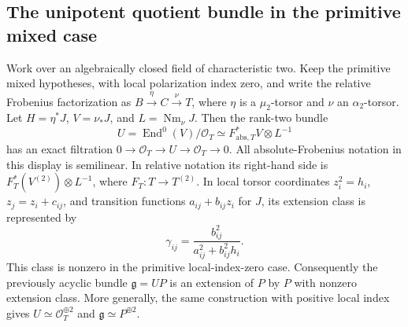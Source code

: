 \subsection{The unipotent quotient bundle in the primitive mixed case}

\begin{lemma}
\label{lem:DE-A3-primitive-unipotent}
Work over an algebraically closed field of characteristic two. Keep the
primitive mixed hypotheses, with local polarization index zero,
and write the relative Frobenius factorization as
\(B\xrightarrow{\eta}C\xrightarrow{\nu}T\), where \(\eta\) is a
\(\mu _2\)-torsor and \(\nu\) an \(\alpha _2\)-torsor. Let
\(H=\eta^*J\), \(V=\nu_*J\), and \(L=\operatorname{Nm}_\nu J\).
Then the rank-two bundle
\[
 U=\operatorname{End}^0(V)/\mathcal O_T
   \simeq F_{\mathrm{abs},T}^*V\otimes L^{-1}
\]
has an exact filtration \(0\to\mathcal O_T\to U\to\mathcal O_T\to0\).
All absolute-Frobenius notation in this display is semilinear. In relative
notation its right-hand side is \(F_T^*(V^{(2)})\otimes L^{-1}\), where
\(F_T:T\to T^{(2)}\).
In local torsor coordinates \(z_i^2=h_i\), \(z_j=z_i+c_{ij}\), and
transition functions \(a_{ij}+b_{ij}z_i\) for \(J\), its extension class
is represented by
\[
 \gamma_{ij}=\frac{b_{ij}^{2}}{a_{ij}^{2}+b_{ij}^{2}h_i}.
 \tag{DE-UB1}
\]
This class is nonzero in the primitive local-index-zero case.
Consequently the previously acyclic bundle \(\mathfrak g=UP\) is an
extension of \(P\) by \(P\) with nonzero extension class.
More generally, the same construction with positive local index gives
\(U\simeq\mathcal O_T^{\oplus2}\) and
\(\mathfrak g\simeq P^{\oplus2}\).
\end{lemma}

